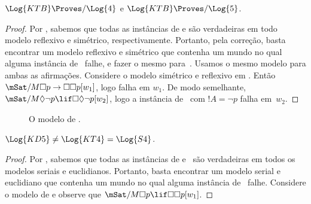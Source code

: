 \documentclass[../../../include/open-logic-section]{subfiles}
\begin{document}
\begin{thm}
  $\Log{KTB} \Proves/ \Log{4}$ e $\Log{KTB} \Proves/ \Log{5}$.
\end{thm}

\begin{proof}
  Por , sabemos que todas as
  instâncias de  e  são verdadeiras em todo modelo
  reflexivo e simétrico, respectivamente. Portanto, pela correção,
  basta encontrar um modelo reflexivo e simétrico que contenha um
  mundo no qual alguma instância de~ falhe, e fazer o mesmo
  para~. Usamos o mesmo modelo para ambas as afirmações.
  Considere o modelo simétrico e reflexivo em .
  Então $\mSat/{M}{\Box p \to \Box \Box p}[w_1]$, logo  falha em
  $w_1$. De modo semelhante, $\mSat/{M}{\Diamond \lnot p \lif \Box
    \Diamond \lnot p}[w_2]$, logo a instância de~ com
  $!A = \lnot p$ falha em~$w_2$.
\end{proof}

\begin{figure}[htpb]
  \centering
  \caption{O modelo de .}
\end{figure}

\begin{thm}
  $\Log{KD5} \neq \Log{KT4} = \Log{S4}$.
\end{thm}

\begin{proof}
  Por , sabemos que todas as
  instâncias de  e~ são verdadeiras em todos os modelos
  seriais e euclidianos. Portanto, basta encontrar um modelo serial e
  euclidiano que contenha um mundo no qual alguma instância de~
  falhe. Considere o modelo de  e observe que
  $\mSat/{M}{\Box p \lif \Box\Box p}[w_1]$.
\end{proof}
\end{document}
